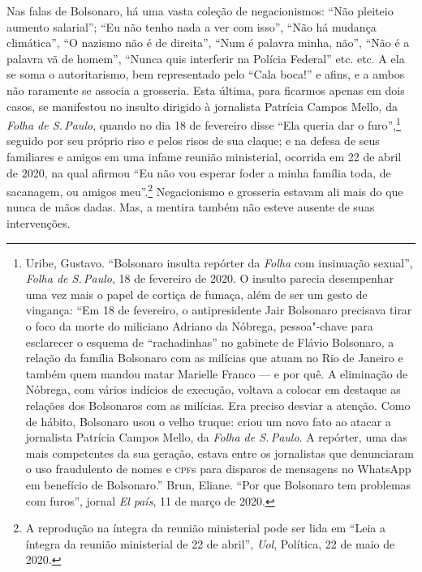 Nas falas de Bolsonaro, há uma vasta coleção de negacionismos: ``Não
pleiteio aumento salarial''; ``Eu não tenho nada a ver com isso'', ``Não
há mudança climática'', ``O nazismo não é de direita'', ``Num é palavra
minha, não'', ``Não é a palavra vã de homem'', ``Nunca quis interferir
na Polícia Federal'' etc. etc. A ela se soma o autoritarismo, bem
representado pelo ``Cala boca!'' e afins, e a ambos não raramente se
associa a grosseria. Esta última, para ficarmos apenas em dois casos, se
manifestou no insulto dirigido à jornalista Patrícia Campos Mello, da
\textit{Folha de S.\,Paulo}, quando no dia 18 de fevereiro disse ``Ela queria dar
o furo'',\footnote{Uribe, Gustavo. ``Bolsonaro insulta repórter da \textit{Folha}
  com insinuação sexual'', \textit{Folha de S.\,Paulo}, 18 de fevereiro de 2020.
  O insulto parecia desempenhar uma vez mais o papel de cortiça de
  fumaça, além de ser um gesto de vingança: ``Em 18 de fevereiro, o
  antipresidente Jair Bolsonaro precisava tirar o foco da morte do
  miliciano Adriano da Nóbrega, pessoa"-chave para esclarecer o esquema
  de ``rachadinhas'' no gabinete de Flávio Bolsonaro, a relação da
  família Bolsonaro com as milícias que atuam no Rio de Janeiro e também
  quem mandou matar Marielle Franco --- e por quê. A eliminação de
  Nóbrega, com vários indícios de execução, voltava a colocar em
  destaque as relações dos Bolsonaros com as milícias. Era preciso
  desviar a atenção. Como de hábito, Bolsonaro usou o velho truque:
  criou um novo fato ao atacar a jornalista Patrícia Campos Mello, da
  \textit{Folha de S.\,Paulo}. A repórter, uma das mais competentes da sua
  geração, estava entre os jornalistas que denunciaram o uso fraudulento
  de nomes e \textsc{cpf}s para disparos de mensagens no WhatsApp em benefício de
  Bolsonaro.'' Brun, Eliane. ``Por que Bolsonaro tem problemas com furos'',
  jornal \emph{El país}, 11 de março de 2020.}
seguido por seu próprio riso e pelos risos de sua claque; e na defesa de
seus familiares e amigos em uma infame reunião ministerial, ocorrida em
22 de abril de 2020, na qual afirmou ``Eu não vou esperar foder a minha
família toda, de sacanagem, ou amigos meu''.\footnote{A reprodução na
  íntegra da reunião ministerial pode ser lida em ``Leia a íntegra da reunião ministerial de 22 de abril'', \textit{Uol}, Política, 22 de maio de 2020.}
Negacionismo e grosseria estavam ali mais do que nunca de mãos dadas.
Mas, a mentira também não esteve ausente de suas intervenções.

